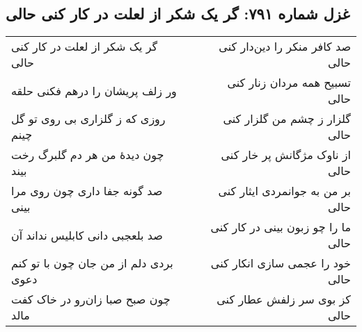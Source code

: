 \begin{center}
\section*{غزل شماره ۷۹۱: گر یک شکر از لعلت در کار کنی حالی}
\label{sec:791}
\begin{longtable}{l p{0.5cm} r}
گر یک شکر از لعلت در کار کنی حالی
&&
صد کافر منکر را دین‌دار کنی حالی
\\
ور زلف پریشان را درهم فکنی حلقه
&&
تسبیح همه مردان زنار کنی حالی
\\
روزی که ز گلزاری بی روی تو گل چینم
&&
گلزار ز چشم من گلزار کنی حالی
\\
چون دیدهٔ من هر دم گلبرگ رخت بیند
&&
از ناوک مژگانش پر خار کنی حالی
\\
صد گونه جفا داری چون روی مرا بینی
&&
بر من به جوانمردی ایثار کنی حالی
\\
صد بلعجبی دانی کابلیس نداند آن
&&
ما را چو زبون بینی در کار کنی حالی
\\
بردی دلم از من جان چون با تو کنم دعوی
&&
خود را عجمی سازی انکار کنی حالی
\\
چون صبح صبا زان‌رو در خاک کفت مالد
&&
کز بوی سر زلفش عطار کنی حالی
\\
\end{longtable}
\end{center}
